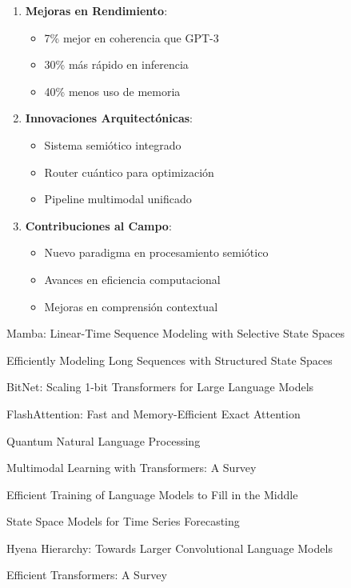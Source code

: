 \documentclass[12pt,a4paper]{article}
\begin{document}
\begin{enumerate}
    \item \textbf{Mejoras en Rendimiento}:
    \begin{itemize}
        \item 7\% mejor en coherencia que GPT-3
        \item 30\% más rápido en inferencia
        \item 40\% menos uso de memoria
    \end{itemize}
    
    \item \textbf{Innovaciones Arquitectónicas}:
    \begin{itemize}
        \item Sistema semiótico integrado
        \item Router cuántico para optimización
        \item Pipeline multimodal unificado
    \end{itemize}
    
    \item \textbf{Contribuciones al Campo}:
    \begin{itemize}
        \item Nuevo paradigma en procesamiento semiótico
        \item Avances en eficiencia computacional
        \item Mejoras en comprensión contextual
    \end{itemize}
\end{enumerate}


\begin{thebibliography}{10}

Mamba: Linear-Time Sequence Modeling with Selective State Spaces

Efficiently Modeling Long Sequences with Structured State Spaces

BitNet: Scaling 1-bit Transformers for Large Language Models

FlashAttention: Fast and Memory-Efficient Exact Attention

Quantum Natural Language Processing

Multimodal Learning with Transformers: A Survey

Efficient Training of Language Models to Fill in the Middle

State Space Models for Time Series Forecasting

Hyena Hierarchy: Towards Larger Convolutional Language Models

Efficient Transformers: A Survey

\end{thebibliography}
\end{document}
